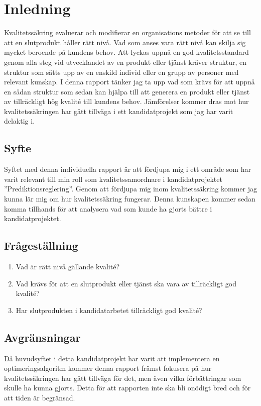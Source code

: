 \section{Inledning}
Kvalitetssäkring evaluerar och modifierar en organisations metoder för att se till att en slutprodukt håller rätt nivå. Vad som anses vara rätt nivå kan skilja sig mycket beroende på kundens behov. 
\newline
\newline
Att lyckas uppnå en god kvalitetsstandard genom alla steg vid utvecklandet av en produkt eller tjänst kräver struktur, en struktur som sätts upp av en enskild individ eller en grupp av personer med relevant kunskap. I denna rapport tänker jag ta upp vad som krävs för att uppnå en sådan struktur som sedan kan hjälpa till att generera en produkt eller tjänst av tillräckligt hög kvalité till kundens behov. Jämförelser kommer dras mot hur kvalitetssäkringen har gått tillväga i ett kandidatprojekt som jag har varit delaktig i.

\subsection{Syfte}
Syftet med denna individuella rapport är att fördjupa mig i ett område som har varit relevant till min roll som kvalitetssamordnare i kandidatprojektet ''Prediktionsreglering''. 
\newline
\newline
Genom att fördjupa mig inom kvalitetssäkring kommer jag kunna lär mig om hur kvalitetssäkring fungerar. Denna kunskapen kommer sedan komma tillhands för att analysera vad som kunde ha gjorts bättre i kandidatprojektet.

\subsection{Frågeställning}

\begin{enumerate}
  \item Vad är rätt nivå gällande kvalité?
  \item Vad krävs för att en slutprodukt eller tjänst ska vara av tillräckligt god kvalité?
  \item Har slutprodukten i kandidatarbetet tillräckligt god kvalité?
\end{enumerate}

\subsection{Avgränsningar}

Då huvudsyftet i detta kandidatprojekt har varit att implementera en optimeringsalgoritm kommer denna rapport främst fokusera på hur kvalitetssäkringen har gått tillväga för det, men även vilka förbättringar som skulle ha kunna gjorts. Detta för att rapporten inte ska bli onödigt bred och för att tiden är begränsad.


